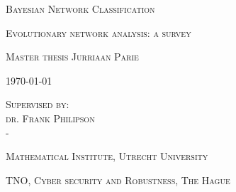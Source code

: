 \documentclass[a4paper, twoside, 11pt]{report}
\theoremstyle{plain}
\theoremstyle{definition}
\theoremstyle{remark}
\begin{document}






\begin{titlepage}
	\centering
	\vspace{1cm}

	{
		\huge
		\textsc{Bayesian Network Classification}
	}
	
	\vspace{0.25cm}
	
	{
		\large
		\textsc{Evolutionary network analysis: a survey}
	}

	\vspace{1.5cm}

	{
		\Large
		\textsc{Master thesis Jurriaan Parie}
	}

	\vspace{1cm}

	{
		\large
		\textsc{\today}
	}
	
		\vspace{2cm}
	
	{
		\large
		\textsc{Supervised by: \\
		dr. Frank Philipson\\
		-}
	}
	
	\vspace{3cm}
	
	{
		\large
		\textsc{Mathematical Institute, Utrecht University}
	}
		
	\vspace{0.5cm}
		
	{
		\large
		\textsc{TNO, Cyber security and Robustness, The Hague}
	}
	
	\vspace{2cm}
%	
	
\end{titlepage}


\pagestyle{plain}





\end{document}
